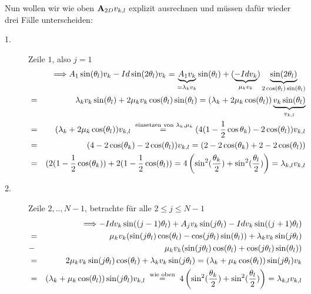 Nun wollen wir wie oben ${\textbf{A}}_{2D} v_{k,l}$ explizit ausrechnen und müssen dafür wieder drei Fälle unterscheiden:
\begin{description}
\item[1.] Zeile $1$, also $j = 1$
\begin{eqnarray}
&&\Longrightarrow A_{1} \sin(\theta_{l}) v_{k} - Id \sin(2\theta_{l}) v_{k} = \underbrace{A_{1} v_{k}}_{=\lambda_{k} v_{k}} \sin(\theta_{l}) + (\underbrace{-Id v_{k}}_{\mu_{k} v_{k}}) \underbrace{\sin(2\theta_{l})}_{2\cos({\theta_{l})\sin({\theta_{l}})}} \notag \\
&=& \lambda_{k}v_{k}\sin(\theta_{l}) + 2\mu_{k}v_{k}\cos(\theta_{l})\sin(\theta_{l}) = (\lambda_{k} + 2\mu_{k}\cos(\theta_{l})) \underbrace{v_{k}\sin(\theta_{l})}_{v_{k,l}} \notag \\
&=& (\lambda_{k} + 2\mu_{k}\cos(\theta_{l}))v_{k,l} \overset{\textnormal{ einsetzen von } \lambda_{k},\mu_{k}}{=} (4(1 - \frac{1}{2}\cos{\theta_{k}}) - 2\cos(\theta_{l})) v_{k,l} \notag \\
&=& (4 - 2\cos(\theta_{k}) - 2\cos(\theta_{l})) v_{k,l} = (2 - 2\cos(\theta_{k}) + 2 - 2\cos(\theta_{l})) \notag \\
&=& (2(1 - \frac{1}{2}\cos(\theta_{k})) + 2(1 - \frac{1}{2}\cos(\theta_{l})) = 4 \left(\sin^{2}(\frac {\theta_{k}} {2}) + \sin^{2}(\frac {\theta_{l}} {2})\right) = \lambda_{k,l} v_{k,l} \notag
\end{eqnarray}
\item[2.] Zeile $2,..,N-1$, betrachte für alle $2 \le j \le N-1$
\begin{eqnarray}
&&\Longrightarrow -Id v_{k} \sin((j-1) \theta_{l}) + A_{j} v_{k} \sin(j\theta_{l}) - Id v_{k} \sin((j+1) \theta_{l}) \notag \\
&=& \mu_{k} v_{k} (\sin(j\theta_{l})\cos(\theta_{l}) - \cos(j\theta_{l})\sin(\theta_{l})) + \lambda_{k} v_{k} \sin(j\theta_{l}) \notag \\
&-& \mu_{k} v_{k} (\sin(j\theta_{l})\cos(\theta_{l}) + \cos(j\theta_{l})\sin(\theta_{l})) \notag \\
&=& 2 \mu_{k} v_{k} \sin(j\theta_{l})\cos(\theta_{l}) + \lambda_{k} v_{k} \sin(j\theta_{l}) = (\lambda_{k} + \mu_{k} \cos(\theta_{l})) \sin(j\theta_{l}) v_{k} \notag \\
&=& (\lambda_{k} + \mu_{k} \cos(\theta_{l})) \sin(j\theta_{l}) v_{k,l} \overset{\textnormal{ wie oben }}{=} 4 \left(\sin^{2}(\frac {\theta_{k}} {2}) + \sin^{2}(\frac {\theta_{l}} {2})\right) = \lambda_{k,l} v_{k,l} \notag
\end{eqnarray}

\end{description}
